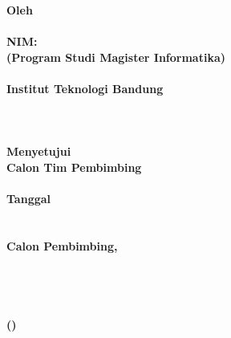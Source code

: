\clearpage
{}

\begin{spacing}{1}
\begin{center}
  \smallskip
  \large \bfseries \MakeUppercase{\Title}\\
  \hfill\\
  \hfill\\
  \normalsize \normalfont Oleh\\
  \large \bfseries \AuthorName\\
  NIM:~\MakeUppercase{\AuthorNIM}\\
  \normalsize (Program Studi Magister Informatika)\\
  \hfill\\
  \normalsize \normalfont Institut Teknologi Bandung \\
  \hfill\\
  \hfill\\
  \hfill\\
  Menyetujui\\
  Calon Tim Pembimbing\\
  \hfill\\
  Tanggal \ThesisDate \\
  \hfill\\
  \hfill\\
  Calon Pembimbing,\\
  \hfill\\
  \hfill\\
  \hfill\\
  \hfill\\
  (\SupervisorName)
\end{center}
\end{spacing}
